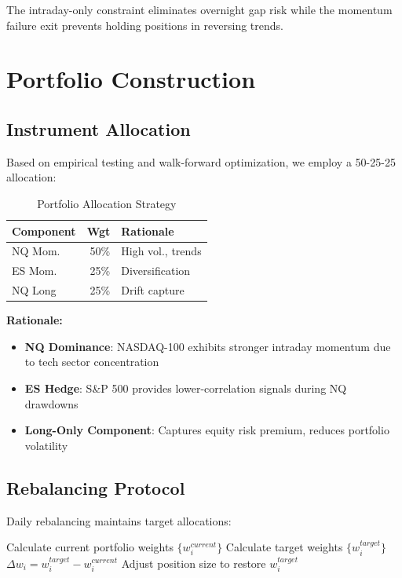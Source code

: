 \documentclass[twocolumn,ieee]{arithmaxresearch}
\begin{document}
The intraday-only constraint eliminates overnight gap risk while the momentum failure exit prevents holding positions in reversing trends.

\section{Portfolio Construction}

\subsection{Instrument Allocation}

Based on empirical testing and walk-forward optimization, we employ a 50-25-25 allocation:

\begin{table}[h]
\centering
\caption{Portfolio Allocation Strategy}
\label{tab:allocation}
\small
\begin{tabular}{@{}lrl@{}}
\toprule
\textbf{Component} & \textbf{Wgt} & \textbf{Rationale} \\
\midrule
NQ Mom. & 50\% & High vol., trends \\
ES Mom. & 25\% & Diversification \\
NQ Long & 25\% & Drift capture \\
\bottomrule
\end{tabular}
\end{table}

\textbf{Rationale:}
\begin{itemize}
    \item \textbf{NQ Dominance}: NASDAQ-100 exhibits stronger intraday momentum due to tech sector concentration
    \item \textbf{ES Hedge}: S\&P 500 provides lower-correlation signals during NQ drawdowns
    \item \textbf{Long-Only Component}: Captures equity risk premium, reduces portfolio volatility
\end{itemize}

\subsection{Rebalancing Protocol}

Daily rebalancing maintains target allocations:

\begin{algorithm}
\caption{Daily Rebalancing Algorithm}
\begin{algorithmic}[1]
\State Calculate current portfolio weights $\{w_i^{current}\}$
\State Calculate target weights $\{w_i^{target}\}$
    \State $\Delta w_i = w_i^{target} - w_i^{current}$
        \State Adjust position size to restore $w_i^{target}$
    \EndIf
\EndFor
\end{algorithmic}
\end{algorithm}
\end{document}
